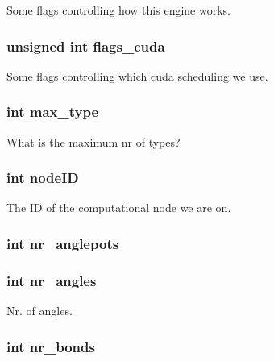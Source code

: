 Some flags controlling how this engine works. \hypertarget{structengine_a4669eb2b5a527db6d15e894f6a37b3d8}{
\subsubsection[{flags\-\_\-cuda}]{\setlength{\rightskip}{0pt plus 5cm}unsigned int flags\-\_\-cuda}}\label{structengine_a4669eb2b5a527db6d15e894f6a37b3d8}
Some flags controlling which cuda scheduling we use. \hypertarget{structengine_ac30f9e387650c2e0c70944a5d6bd8275}{
\subsubsection[{max\-\_\-type}]{\setlength{\rightskip}{0pt plus 5cm}int max\-\_\-type}}\label{structengine_ac30f9e387650c2e0c70944a5d6bd8275}
What is the maximum nr of types? \hypertarget{structengine_a2253df22e702f6bc02a8b7d839aec819}{
\subsubsection[{node\-I\-D}]{\setlength{\rightskip}{0pt plus 5cm}int node\-I\-D}}\label{structengine_a2253df22e702f6bc02a8b7d839aec819}
The I\-D of the computational node we are on. \hypertarget{structengine_ad4840b796f70975b11dee781cb07da7e}{
\subsubsection[{nr\-\_\-anglepots}]{\setlength{\rightskip}{0pt plus 5cm}int nr\-\_\-anglepots}}\label{structengine_ad4840b796f70975b11dee781cb07da7e}
\hypertarget{structengine_a03b0ba344cd1442d3d3975774eeea3e9}{
\subsubsection[{nr\-\_\-angles}]{\setlength{\rightskip}{0pt plus 5cm}int nr\-\_\-angles}}\label{structengine_a03b0ba344cd1442d3d3975774eeea3e9}
Nr. of angles. \hypertarget{structengine_ad29e940869fdac422337511d82a22ae6}{
\subsubsection[{nr\-\_\-bonds}]{\setlength{\rightskip}{0pt plus 5cm}int nr\-\_\-bonds}}\label{structengine_ad29e940869fdac422337511d82a22ae6}
